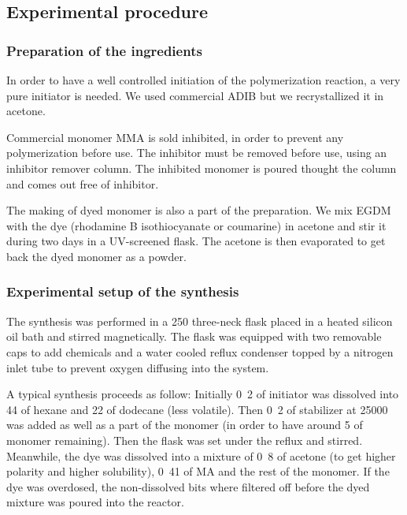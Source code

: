 \subsection{Experimental procedure}


\subsubsection{Preparation of the ingredients}

In order to have a well controlled initiation of the polymerization reaction, a very pure initiator is needed. We used commercial \ac{ADIB} but we recrystallized it in acetone.

Commercial monomer \ac{MMA} is sold inhibited, in order to prevent any polymerization before use. The inhibitor must be removed before use, using an inhibitor remover column. The inhibited monomer is poured thought the column and comes out free of inhibitor.

The making of dyed monomer is also a part of the preparation. We mix \ac{EGDM} with the dye (rhodamine B isothiocyanate or coumarine) in acetone and stir it during two days in a UV-screened flask. The acetone is then evaporated to get back the dyed monomer as a powder.


\subsubsection{Experimental setup of the synthesis}

The synthesis was performed in a \unit{250}{\milli\litre} three-neck flask placed in a heated silicon oil bath and stirred magnetically. The flask was equipped with two removable caps to add chemicals and a water cooled reflux condenser topped by a nitrogen inlet tube to prevent oxygen diffusing into the system.

A typical synthesis proceeds as follow: Initially \unit{0.2}{\gram} of initiator was dissolved into \unit{44}{\gram} of hexane and \unit{22}{\gram} of dodecane (less volatile). Then \unit{0.2}{\gram} of stabilizer at \unit{25000}{\gram\per\mole} was added as well as a part of the monomer (in order to have around \unit{5}{\gram} of monomer remaining). Then the flask was set under the reflux and stirred. Meanwhile, the dye was dissolved into a mixture of \unit{0.8}{\gram} of acetone (to get higher polarity and higher solubility), \unit{0.41}{\gram} of \ac{MA} and the rest of the monomer. If the dye was overdosed, the non-dissolved bits where filtered off before the dyed mixture was poured into the reactor.

